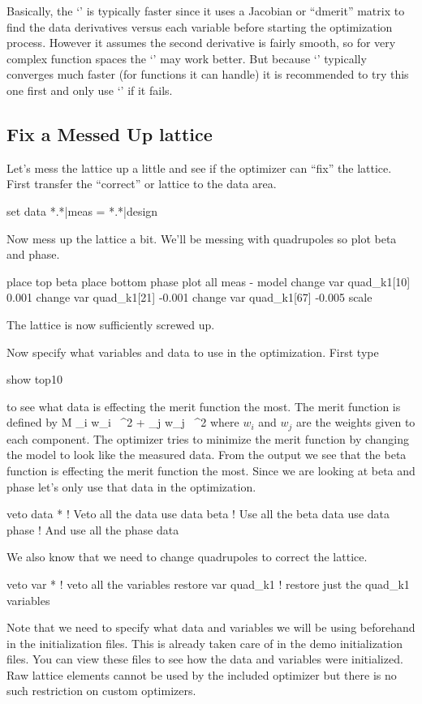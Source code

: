 Basically, the `' is typically faster since it uses a Jacobian
or ``dmerit'' matrix to find the data derivatives versus each variable
before starting the optimization process.  However it assumes the
second derivative is fairly smooth, so for very complex function
spaces the `' may work better. But because `' typically
converges much faster (for functions it can handle) it is recommended
to try this one first and only use `' if it fails.

\subsection{Fix a Messed Up lattice}
\label{ss:fix_it}

Let's mess the lattice up a little and see if the optimizer can
``fix'' the lattice. First transfer the ``correct'' or 
lattice to the  data area.
\begin{example}
  set data *.*|meas = *.*|design
\end{example}
Now mess up the lattice a bit. We'll be messing with quadrupoles so
plot beta and phase.
\begin{example}
  place top beta
  place bottom phase
  plot all meas - model
  change var quad\_k1[10] 0.001
  change var quad\_k1[21] -0.001
  change var quad\_k1[67] -0.005
  scale
\end{example}
The lattice is now sufficiently screwed up.

Now specify what variables and data to use in the optimization. First type
\begin{example}
  show top10
\end{example}
to see what data is effecting the merit function the most. The merit
function is defined by
\Begineq
  {\cal M} \equiv \sum_{i} w_i \,
    ^2 + 
  \sum_{j} w_j \,
    ^2
  \label{eq:merit}
\Endeq
where $w_{i}$ and $w_{j}$ are the weights given to each component.
The optimizer tries to minimize the merit function by changing the
model to look like the measured data. From the  output we
see that the beta function is effecting the merit function the
most. Since we are looking at beta and phase let's only use that data
in the optimization.
\begin{example}
  veto data *         ! Veto all the data
  use  data beta      ! Use all the beta data
  use  data phase     ! And use all the phase data
\end{example}
We also know that we need to change quadrupoles to correct the lattice.
\begin{example}
  veto var *           ! veto all the variables
  restore var quad\_k1 ! restore just the quad\_k1 variables
\end{example}
Note that we need to specify what data and variables we will be using
beforehand in the initialization files. This is already taken care of
in the demo initialization files. You can view these files to see how
the data and variables were initialized. Raw lattice elements cannot
be used by the included optimizer but there is no such restriction on
custom optimizers.

